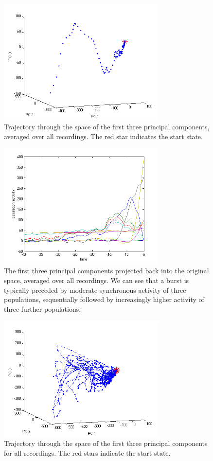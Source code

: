 \documentclass{scrartcl}
\begin{document}
\begin{figure}[h]
\centering
\includegraphics[trim = {0.4cm 0.1cm 1cm 0.7cm}, width=0.75\textwidth, clip]{../pics/trace_avg}
\caption{Trajectory through the space of the first three principal components, averaged over all recordings. The red star indicates the start state.}
\label{}
\end{figure}

\begin{figure}[h]
\centering
\includegraphics[trim = {0.7cm 0.3cm 1cm 0.7cm}, width=0.75\textwidth, clip]{../pics/denoised}
\caption{The first three principal components projected back into the original space, averaged over all recordings. We can see that a burst is typically preceded by moderate synchronous activity of three populations, sequentially followed by increasingly higher activity of three further populations.}
\label{}
\end{figure}

\begin{figure}[h]
\centering
\includegraphics[trim = {0.4cm 0.1cm 1cm 0.7cm}, width=0.75\textwidth, clip]{../pics/traces_all}
\caption{Trajectory through the space of the first three principal components for all recordings. The red stars indicate the start state.}
\label{}
\end{figure}
\end{document}
